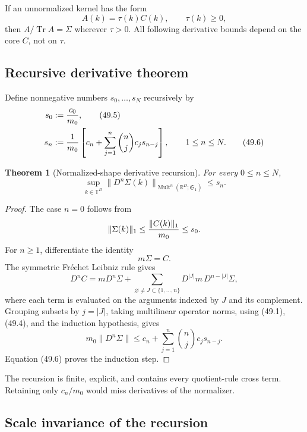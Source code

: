 \documentclass[11pt]{article}
\newtheorem{theorem}{Theorem}[section]
\theoremstyle{remark}
\begin{document}
If an unnormalized kernel has the form
\[
 A(k)=\tau(k)C(k),\qquad\tau(k)\geq0,
\]
then \(A/\operatorname{Tr}A=\Sigma\) wherever \(\tau>0\).
All following derivative bounds depend on the core \(C\), not on
\(\tau\).

\subsection{Recursive derivative theorem}

Define nonnegative numbers \(s_0,\ldots,s_N\) recursively by
\begin{align}
 s_0&:={c_0\over m_0},                            \tag{49.5}\\
 s_n&:={1\over m_0}
 \left[
 c_n+\sum_{j=1}^n
 \binom nj c_j s_{n-j}
 \right],
 \qquad1\leq n\leq N.                            \tag{49.6}
\end{align}

\begin{theorem}[Normalized-shape derivative recursion]
\label{thm:v12v49-recursion}
For every \(0\leq n\leq N\),
\begin{equation}
 \sup_{k\in{\mathbb T}^D}
 \|D^n\Sigma(k)\|_{\operatorname{Mult}^n
  (\mathbb R^D;{\mathfrak S}_1)}
 \leq s_n.                                       \tag{49.7}
\end{equation}
\end{theorem}

\begin{proof}
The case \(n=0\) follows from
\[
 \|\Sigma(k)\|_1\leq{\|C(k)\|_1\over m_0}\leq s_0.
\]
For \(n\geq1\), differentiate the identity
\[
                         m\Sigma=C.
\]
The symmetric Fr\'echet Leibniz rule gives
\begin{equation}
 D^nC
 =
 mD^n\Sigma
 +
 \sum_{\varnothing\ne J\subset\{1,\ldots,n\}}
 D^{|J|}m\,D^{n-|J|}\Sigma,                      \tag{49.8}
\end{equation}
where each term is evaluated on the arguments indexed by \(J\) and
its complement.  Grouping subsets by \(j=|J|\), taking multilinear
operator norms, using (49.1), (49.4), and the induction hypothesis,
gives
\[
 m_0\|D^n\Sigma\|
 \leq
 c_n+\sum_{j=1}^n\binom njc_js_{n-j}.
\]
Equation (49.6) proves the induction step.
\end{proof}

The recursion is finite, explicit, and contains every quotient-rule
cross term.  Retaining only \(c_n/m_0\) would miss derivatives of the
normalizer.

\subsection{Scale invariance of the recursion}
\end{document}
